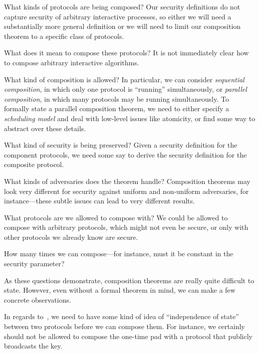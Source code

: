 \begin{questions}
  \item What kinds of protocols are being composed? Our security definitions do not
    capture security of arbitrary interactive processes, so either we will
    need a substantially more general definition or we will need to limit
    our composition theorem to a specific class of
    protocols.\label{q:composed-protocols}
  \item What does it mean to compose these protocols? It is not immediately
    clear how to compose arbitrary interactive
    algorithms.\label{q:composition-meaning}
  \item What kind of composition is allowed? In particular, we can
    consider \emph{sequential composition}, in which only one protocol is
    ``running'' simultaneously, or \emph{parallel composition}, in which many
    protocols may be running simultaneously. To formally state a parallel
    composition theorem, we need to either specify a \emph{scheduling model} and
    deal with low-level issues like atomicity, or find some way to abstract over
    these details.\label{q:allowed-composition}
  \item What kind of security is being preserved? Given a security definition
    for the component protocols, we need some say to derive the security
    definition for the composite protocol.\label{q:preserved-security}
  \item What kinds of adversaries does the theorem handle? Composition theorems
    may look very different for security against uniform and non-uniform
    adversaries, for instance---these subtle issues can lead to very different
    results.\label{q:adversarial-model}
  \item What protocols are we allowed to compose with? We could be allowed to
    compose with arbitrary protocols, which might not even be secure, or only
    with other protocols we already know are secure.\label{q:compose-with}
  \item How many times we can compose---for instance, must it be constant in the
    security parameter?\label{q:count-compositions}
\end{questions}

As these questions demonstrate, composition theorems are really quite difficult
to state. However, even without a formal theorem in mind, we can make a few
concrete observations.

In regards to~, we need to have some kind of
idea of ``independence of state'' between two protocols before we can compose
them. For instance, we certainly should not be allowed to compose the one-time
pad with a protocol that publicly broadcasts the key.

